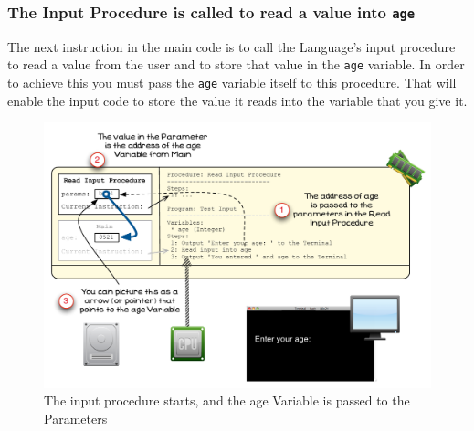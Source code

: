 
\clearpage
\subsubsection{The Input Procedure is called to read a value into \texttt{age}} %
\label{ssub:the_input_procedure_is_called_to_read_a_value_into_age}

The next instruction in the main code is to call the Language's input procedure to read a value from the user and to store that value in the \texttt{age} variable. In order to achieve this you must pass the \texttt{age} variable itself to this procedure. That will enable the input code to store the value it reads into the variable that you give it.

\begin{figure}[htbp]
   \centering
   \includegraphics[width=\textwidth]{./topics/storing-using-data/images/vis-ref-2} 
   \caption{The input procedure starts, and the age Variable is passed to the Parameters}
   \label{fig:vis-ref-2}
\end{figure}

